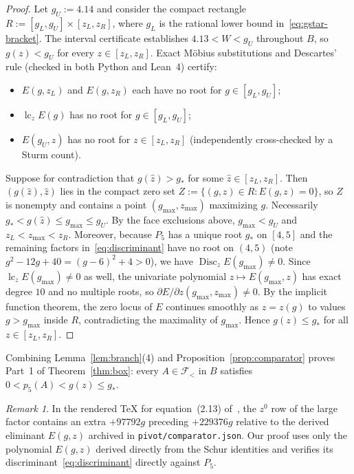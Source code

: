 \documentclass[11pt]{article}
\theoremstyle{remark}
\newtheorem{remark}[theorem]{Remark}
\begin{document}
\begin{proof}
Let $g_U := 4.14$ and consider the compact rectangle
$R := [g_L,g_U]\times[z_L,z_R]$, where $g_L$ is the rational lower bound
in~\eqref{eq:gstar-bracket}. The interval certificate establishes
$4.13 < W < g_U$ throughout $B$, so $g(z)<g_U$ for every $z\in[z_L,z_R]$.
Exact M\"obius substitutions and Descartes' rule (checked in both Python and
Lean~4) certify:
\begin{itemize}
  \item $E(g,z_L)$ and $E(g,z_R)$ each have no root for $g\in[g_L,g_U]$;
  \item $\operatorname{lc}_z E(g)$ has no root for $g\in[g_L,g_U]$;
  \item $E(g_U,z)$ has no root for $z\in[z_L,z_R]$ (independently cross-checked
  by a Sturm count).
\end{itemize}

Suppose for contradiction that $g(\hat z) > g_*$ for some
$\hat z\in[z_L,z_R]$. Then $(g(\hat z),\hat z)$ lies in the compact zero set
$Z := \{(g,z)\in R : E(g,z)=0\}$, so $Z$ is nonempty and contains a point
$(g_{\max},z_{\max})$ maximizing $g$. Necessarily
$g_* < g(\hat z) \le g_{\max} \le g_U$. By the face exclusions above,
$g_{\max}<g_U$ and $z_L < z_{\max} < z_R$. Moreover, because $P_5$ has a
unique root $g_*$ on $[4,5]$ and the remaining factors in~\eqref{eq:discriminant}
have no root on $(4,5)$ (note $g^2-12g+40=(g-6)^2+4>0$), we have
$\operatorname{Disc}_z E(g_{\max})\ne 0$. Since
$\operatorname{lc}_z E(g_{\max})\ne 0$ as well, the univariate polynomial
$z\mapsto E(g_{\max},z)$ has exact degree $10$ and no multiple roots, so
$\partial E/\partial z(g_{\max},z_{\max})\ne 0$. By the implicit function
theorem, the zero locus of $E$ continues smoothly as $z=z(g)$ to values
$g > g_{\max}$ inside $R$, contradicting the maximality of $g_{\max}$.
Hence $g(z)\le g_*$ for all $z\in[z_L,z_R]$.
\end{proof}

Combining Lemma~\ref{lem:branch}(4) and Proposition~\ref{prop:comparator}
proves Part~1 of Theorem~\ref{thm:box}: every $A\in\mathcal{F}_{<}$ in $B$
satisfies $0 < p_5(A) < g(z) \le g_*$.

\begin{remark}\label{rem:typo}
In the rendered TeX for equation~(2.13) of~\cite{CEU2026}, the $z^0$ row of
the large factor contains an extra $+97792g$ preceding $+229376g$ relative to
the derived eliminant $E(g,z)$ archived in \texttt{pivot/comparator.json}. Our
proof uses only the polynomial $E(g,z)$ derived directly from the Schur
identities and verifies its discriminant~\eqref{eq:discriminant} directly
against $P_5$.
\end{remark}
\end{document}
